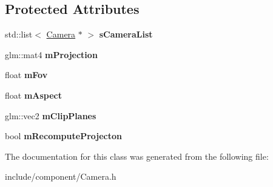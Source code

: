 \subsection*{\-Protected \-Attributes}
\begin{DoxyCompactItemize}
\item 
\hypertarget{classde_1_1component_1_1_camera_a8c5f7fd5ffae706186dbf03a048bdc5d}{
std\-::list$<$ \hyperlink{classde_1_1component_1_1_camera}{\-Camera} $\ast$ $>$ {\bfseries s\-Camera\-List}}
\label{classde_1_1component_1_1_camera_a8c5f7fd5ffae706186dbf03a048bdc5d}

\item 
\hypertarget{classde_1_1component_1_1_camera_a2b7327497effbec1fb121b6c3cbb8573}{
glm\-::mat4 {\bfseries m\-Projection}}
\label{classde_1_1component_1_1_camera_a2b7327497effbec1fb121b6c3cbb8573}

\item 
\hypertarget{classde_1_1component_1_1_camera_ad05c34679985bb26b81fc42d90ad0efb}{
float {\bfseries m\-Fov}}
\label{classde_1_1component_1_1_camera_ad05c34679985bb26b81fc42d90ad0efb}

\item 
\hypertarget{classde_1_1component_1_1_camera_a21555a64ca5dfeb1e9bcc5e34be934cf}{
float {\bfseries m\-Aspect}}
\label{classde_1_1component_1_1_camera_a21555a64ca5dfeb1e9bcc5e34be934cf}

\item 
\hypertarget{classde_1_1component_1_1_camera_ace8f2bcca61e08b2d6e4b2863d367c54}{
glm\-::vec2 {\bfseries m\-Clip\-Planes}}
\label{classde_1_1component_1_1_camera_ace8f2bcca61e08b2d6e4b2863d367c54}

\item 
\hypertarget{classde_1_1component_1_1_camera_a4f47596f8d746b39940afa43c68f6512}{
bool {\bfseries m\-Recompute\-Projecton}}
\label{classde_1_1component_1_1_camera_a4f47596f8d746b39940afa43c68f6512}

\end{DoxyCompactItemize}


\-The documentation for this class was generated from the following file\-:\begin{DoxyCompactItemize}
\item 
include/component/\-Camera.\-h\end{DoxyCompactItemize}
